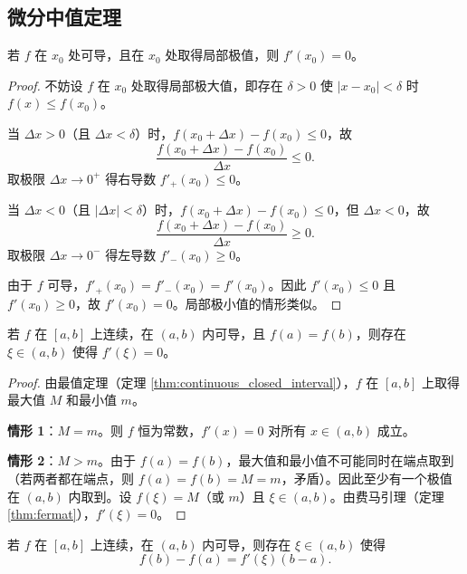 \subsection{\texorpdfstring{微分中值定理}{微分中值定理}}

\begin{theorem}[费马引理]\label{thm:fermat}
若 $f$ 在 $x_0$ 处可导，且在 $x_0$ 处取得局部极值，则 $f'(x_0) = 0$。
\end{theorem}

\begin{proof}
不妨设 $f$ 在 $x_0$ 处取得局部极大值，即存在 $\delta > 0$ 使 $|x - x_0| < \delta$ 时 $f(x) \le f(x_0)$。

当 $\Delta x > 0$（且 $\Delta x < \delta$）时，$f(x_0 + \Delta x) - f(x_0) \le 0$，故
\[
\frac{f(x_0+\Delta x) - f(x_0)}{\Delta x} \le 0.
\]
取极限 $\Delta x \to 0^+$ 得右导数 $f'_+(x_0) \le 0$。

当 $\Delta x < 0$（且 $|\Delta x| < \delta$）时，$f(x_0 + \Delta x) - f(x_0) \le 0$，但 $\Delta x < 0$，故
\[
\frac{f(x_0+\Delta x) - f(x_0)}{\Delta x} \ge 0.
\]
取极限 $\Delta x \to 0^-$ 得左导数 $f'_-(x_0) \ge 0$。

由于 $f$ 可导，$f'_+(x_0) = f'_-(x_0) = f'(x_0)$。因此 $f'(x_0) \le 0$ 且 $f'(x_0) \ge 0$，故 $f'(x_0) = 0$。局部极小值的情形类似。
\end{proof}

\begin{theorem}[罗尔定理]\label{thm:rolle}
若 $f$ 在 $[a,b]$ 上连续，在 $(a,b)$ 内可导，且 $f(a) = f(b)$，则存在 $\xi \in (a,b)$ 使得 $f'(\xi) = 0$。
\end{theorem}

\begin{proof}
由最值定理（定理 \ref{thm:continuous_closed_interval}），$f$ 在 $[a,b]$ 上取得最大值 $M$ 和最小值 $m$。

\textbf{情形 1}：$M = m$。则 $f$ 恒为常数，$f'(x) = 0$ 对所有 $x \in (a,b)$ 成立。

\textbf{情形 2}：$M > m$。由于 $f(a) = f(b)$，最大值和最小值不可能同时在端点取到（若两者都在端点，则 $f(a) = f(b) = M = m$，矛盾）。因此至少有一个极值在 $(a,b)$ 内取到。设 $f(\xi) = M$（或 $m$）且 $\xi \in (a,b)$。由费马引理（定理 \ref{thm:fermat}），$f'(\xi) = 0$。
\end{proof}

\begin{theorem}[拉格朗日中值定理]\label{thm:lagrange}
若 $f$ 在 $[a,b]$ 上连续，在 $(a,b)$ 内可导，则存在 $\xi \in (a,b)$ 使得
\[f(b) - f(a) = f'(\xi)(b-a).\]
\end{theorem}

